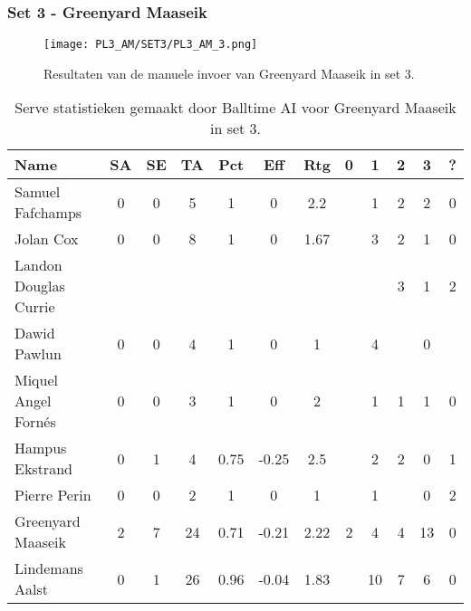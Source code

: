 \subsubsection{Set 3 - Greenyard Maaseik}
\label{sec:PL3_Greenyard3}
\begin{figure}
  \centering
  \texttt{[image: PL3\_AM/SET3/PL3\_AM\_3.png]}
  \caption{\label{fig:PL3_AM_3}Resultaten van de manuele invoer van Greenyard Maaseik in set 3.}
\end{figure}

\begin{table}[ht!]
  \centering
  \scriptsize
  \begin{tabular}{|l|c|c|c|c|c|c|c|c|c|c|c|} \hline
    \textbf{Name} & SA & SE & TA & Pct & Eff & Rtg & 0 & 1 & 2 & 3 & ? \\ \hline
    Samuel Fafchamps & 0 & 0 & 5 & 1 & 0 & 2.2 &   & 1 & 2 & 2 & 0 \\
    Jolan Cox & 0 & 0 & 8 & 1 & 0 & 1.67 &   & 3 & 2 & 1 & 0 \\
    Landon Douglas Currie &   &   &   &   &   &   &   &   & 3 & 1 & 2 \\
    Dawid Pawlun & 0 & 0 & 4 & 1 & 0 & 1 &   & 4 &   & 0 &   \\
    Miquel Angel Fornés & 0 & 0 & 3 & 1 & 0 & 2 &   & 1 & 1 & 1 & 0 \\
    Hampus Ekstrand & 0 & 1 & 4 & 0.75 & -0.25 & 2.5 &   & 2 & 2 & 0 & 1 \\
    Pierre Perin & 0 & 0 & 2 & 1 & 0 & 1 &   & 1 &   & 0 & 2 \\
    Greenyard Maaseik & 2 & 7 & 24 & 0.71 & -0.21 & 2.22 & 2 & 4 & 4 & 13 & 0 \\
    Lindemans Aalst & 0 & 1 & 26 & 0.96 & -0.04 & 1.83 &   & 10 & 7 & 6 & 0 \\ \hline
  \end{tabular}
  \caption[Serve statistieken gemaakt door Balltime AI voor Greenyard Maaseik in set 3]{\label{tab:PL3ServeGreenyard3}Serve statistieken gemaakt door Balltime AI voor Greenyard Maaseik in set 3.}
\end{table}

